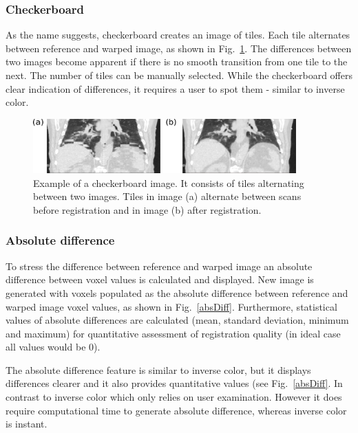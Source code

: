 \documentclass[type=dr, dr=rernat, accentcolor=tud7b,colorbacktitle, bigchapter, openright, twoside, 12pt ]{tudthesis}
\begin{document}
\subsubsection{Checkerboard}

As the name suggests, checkerboard creates an image of tiles. Each tile alternates between reference and warped image, as shown in Fig.~\ref{checkerboard}. The differences between two images become apparent if there is no smooth transition from one tile to the next. The number of tiles can be manually selected. While the checkerboard offers clear indication of differences, it requires a user to spot them - similar to inverse color.

\begin{figure}[H]
	\begin{center}		
		\includegraphics[width=0.9\textwidth]{./Images/checkerboard.png}
		\caption{Example of a checkerboard image. It consists of tiles alternating between two images. Tiles in image (a) alternate between scans before registration and in image (b) after registration.}
		\label{checkerboard}
	\end{center}
\end{figure}

\subsubsection{Absolute difference} 

To stress the difference between reference and warped image an absolute difference between voxel values is calculated and displayed. New image is generated with voxels populated as the absolute difference between reference and warped image voxel values, as shown in Fig.~\ref{absDiff}. Furthermore, statistical values of absolute differences are calculated (mean, standard deviation, minimum and maximum) for quantitative assessment of registration quality (in ideal case all values would be 0).

The absolute difference feature is similar to inverse color, but it displays differences clearer and it also provides quantitative values (see Fig.~\ref{absDiff}. In contrast to inverse color which only relies on user examination. However it does require computational time to generate absolute difference, whereas inverse color is instant.
\end{document}
